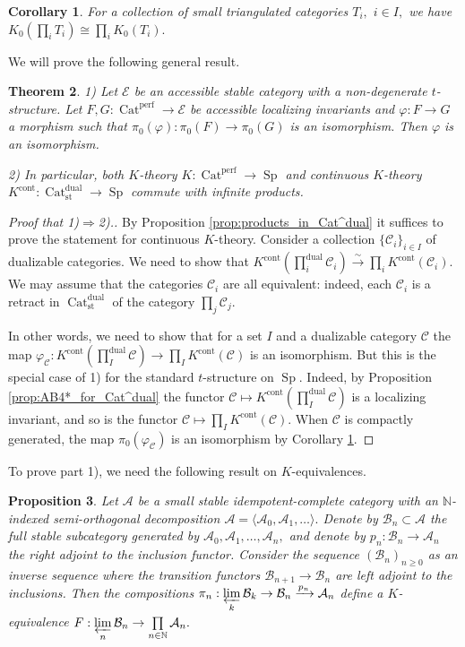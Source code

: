 \documentclass[11pt,leqno]{amsart}
\newtheorem{theo}{Theorem}[section]
\newtheorem{prop}[theo]{Proposition}
\newtheorem{cor}[theo]{Corollary}
\numberwithin{equation}{section}
\def\N{\mathbb{N}}
\newcommand{\prolim}[1][]{\mathop{\varprojlim}\limits_{#1}}
\newcommand{\prodd}[1][]{\mathop{\prod}\limits_{#1}}
\newcommand{\xto}{\xrightarrow}
\newcommand{\Cat}{\operatorname{Cat}}
\newcommand{\cont}{\operatorname{cont}}
\newcommand{\st}{\operatorname{st}}
\newcommand{\dual}{\operatorname{dual}}
\newcommand{\cA}{{\mathcal A}}
\newcommand{\cB}{{\mathcal B}}
\newcommand{\cC}{{\mathcal C}}
\newcommand{\cE}{{\mathcal E}}
\newcommand{\perf}{\operatorname{perf}}
\newcommand{\Sp}{\operatorname{Sp}}
\begin{document}
\begin{cor}\label{cor:K_0_comm_with_products}\cite[Lemma 5.1]{KW19} For a collection of small triangulated categories $T_i,$ $i\in I,$ we have $K_0(\prod_i T_i)\cong \prod_i K_0(T_i).$\end{cor}

We will prove the following general result.

\begin{theo}\label{th:map_of_localizing_invariants} 1) Let $\cE$ be an accessible stable category with a non-degenerate $t$-structure. Let $F,G:\Cat^{\perf}\to\cE$ be accessible localizing invariants and $\varphi:F\to G$ a morphism such that $\pi_0(\varphi):\pi_0(F)\to\pi_0(G)$ is an isomorphism. Then $\varphi$ is an isomorphism.

2) In particular, both $K$-theory $K:\Cat^{\perf}\to\Sp$ and continuous $K$-theory $K^{\cont}:\Cat_{\st}^{\dual}\to\Sp$ commute with infinite products.\end{theo}

\begin{proof}[Proof that 1)$\Rightarrow$2).] By Proposition \ref{prop:products_in_Cat^dual} it suffices to prove the statement for continuous $K$-theory. Consider a collection $\{\cC_i\}_{i\in I}$ of dualizable categories. We need to show that $K^{\cont}(\prod_i^{\dual}\cC_i)\xto{\sim}\prod_i K^{\cont}(\cC_i).$ We may assume that the categories $\cC_i$ are all equivalent: indeed, each $\cC_i$ is a retract in $\Cat_{\st}^{\dual}$ of the category $\prod_j\cC_j.$ 

In other words, we need to show that for a set $I$ and a dualizable category $\cC$ the map $\varphi_{\cC}:K^{\cont}(\prod_I^{\dual}\cC)\to\prod_I K^{\cont}(\cC)$ is an isomorphism. But this is the special case of 1) for the standard $t$-structure on $\Sp.$ Indeed, by Proposition \ref{prop:AB4*_for_Cat^dual} the functor $\cC\mapsto K^{\cont}(\prod_I^{\dual}\cC)$ is a localizing invariant, and so is the functor $\cC\mapsto \prod_I K^{\cont}(\cC).$ When $\cC$ is compactly generated, the map $\pi_0(\varphi_{\cC})$ is an isomorphism by Corollary \ref{cor:K_0_comm_with_products}.\end{proof}

To prove part 1), we need the following result on $K$-equivalences.

\begin{prop}\label{prop:complete_SOD} Let $\cA$ be a small stable idempotent-complete category with an $\N$-indexed semi-orthogonal decomposition
$\cA=\langle\cA_0,\cA_1,\dots\rangle.$ Denote by $\cB_n\subset\cA$ the full stable subcategory generated by $\cA_0,\cA_1,\dots,\cA_n,$ and denote by $p_n:\cB_n\to\cA_n$ the right adjoint to the inclusion functor. Consider the sequence $(\cB_n)_{n\geq 0}$ as an inverse sequence where the transition functors $\cB_{n+1}\to\cB_n$ are left adjoint to the inclusions. Then the compositions $\pi_n:\prolim[k]\cB_k\to\cB_n\xto{p_n}\cA_n$ define a $K$-equivalence $F:\prolim[n]\cB_n\to\prodd[n\in\N]\cA_n.$ 
\end{prop}
\end{document}
